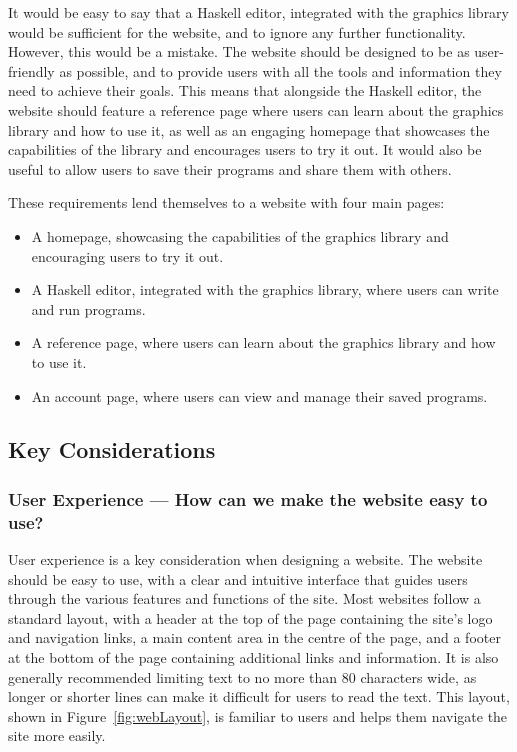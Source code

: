 \documentclass[../main.tex]{subfiles}
\begin{document}
            It would be easy to say that a Haskell editor, integrated with the graphics
                library would be sufficient for the website, and to ignore any further
                functionality.
            However, this would be a mistake.
            The website should be designed to be as user-friendly as possible, and to
                provide users with all the tools and information they need to achieve their
                goals.
            This means that alongside the Haskell editor, the website should feature a
                reference page where users can learn about the graphics library and how to use
                it, as well as an engaging homepage that showcases the capabilities of the
                library and encourages users to try it out.
            It would also be useful to allow users to save their programs and share them
                with others.

            These requirements lend themselves to a website with four main pages:
            \begin{itemize}
                \item A homepage, showcasing the capabilities of the graphics library and
                      encouraging users to try it out.
                \item A Haskell editor, integrated with the graphics library, where users can
                      write and run programs.
                \item A reference page, where users can learn about the graphics library
                      and how to use it.
                \item An account page, where users can view and manage their saved programs.
            \end{itemize}

        \subsection{Key Considerations}
            \subsubsection{User Experience — How can we make the website easy to use?}
                User experience is a key consideration when designing a website.
                The website should be easy to use, with a clear and intuitive interface that
                    guides users through the various features and functions of the site.
                Most websites follow a standard layout, with a header at the top of the page
                    containing the site's logo and navigation links, a main content area in the
                    centre of the page, and a footer at the bottom of the page containing
                    additional links and information.
                It is also generally recommended limiting text to no more than 80 characters
                    wide, as longer or shorter lines can make it difficult for users to read the
                    text.
                This layout, shown in Figure~\ref{fig:webLayout}, is familiar to users and
                    helps them navigate the site more easily.
\end{document}
